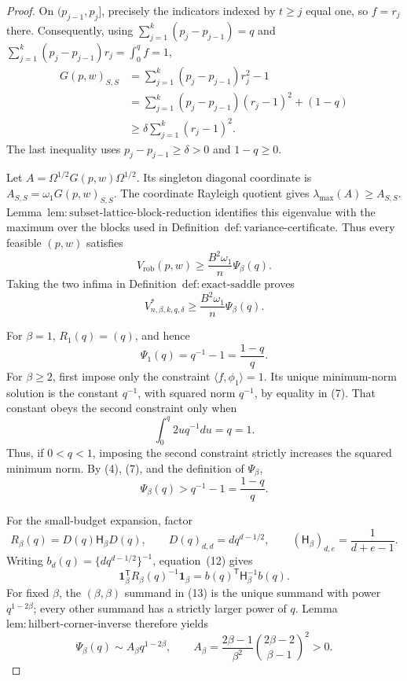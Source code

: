 \documentclass{article}
\begin{document}
\begin{proof}
On \((p_{j-1},p_j]\), precisely the indicators indexed by \(t\ge j\) equal one, so \(f=r_j\) there.  Consequently, using \(\sum_{j=1}^k(p_j-p_{j-1})=q\) and \(\sum_{j=1}^k(p_j-p_{j-1})r_j=\int_0^qf=1\),
\[
\begin{aligned}
G(p,w)_{S,S}
&=\sum_{j=1}^k(p_j-p_{j-1})r_j^2-1\\
&=\sum_{j=1}^k(p_j-p_{j-1})(r_j-1)^2+(1-q)\\
&\ge \delta\sum_{j=1}^k(r_j-1)^2.
\end{aligned}
\tag{8}
\]
The last inequality uses \(p_j-p_{j-1}\ge\delta>0\) and \(1-q\ge0\).

Let \(A=\Omega^{1/2}G(p,w)\Omega^{1/2}\).  Its singleton diagonal coordinate is \(A_{S,S}=\omega_1G(p,w)_{S,S}\).  The coordinate Rayleigh quotient gives \(\lambda_{\max}(A)\ge A_{S,S}\).  Lemma~\(\mathrm{lem{:}subset\text{-}lattice\text{-}block\text{-}reduction}\) identifies this eigenvalue with the maximum over the blocks used in Definition~\(\mathrm{def{:}variance\text{-}certificate}\).  Thus every feasible \((p,w)\) satisfies
\[
V_{\mathrm{rob}}(p,w)
\ge \frac{B^2\omega_1}{n}\Psi_\beta(q).
\]
Taking the two infima in Definition~\(\mathrm{def{:}exact\text{-}saddle}\) proves
\[
V^*_{n,\beta,k,q,\delta}
\ge \frac{B^2\omega_1}{n}\Psi_\beta(q).
\tag{9}
\]

For \(\beta=1\), \(R_1(q)=(q)\), and hence
\[
\Psi_1(q)=q^{-1}-1=\frac{1-q}{q}.
\tag{10}
\]
For \(\beta\ge2\), first impose only the constraint \(\langle f,\phi_1\rangle=1\).  Its unique minimum-norm solution is the constant \(q^{-1}\), with squared norm \(q^{-1}\), by equality in (7).  That constant obeys the second constraint only when
\[
\int_0^q2u q^{-1}du=q=1.
\]
Thus, if \(0<q<1\), imposing the second constraint strictly increases the squared minimum norm.  By (4), (7), and the definition of \(\Psi_\beta\),
\[
\Psi_\beta(q)>q^{-1}-1=\frac{1-q}{q}.
\tag{11}
\]

For the small-budget expansion, factor
\[
R_\beta(q)=D(q)\mathsf H_\beta D(q),
\qquad D(q)_{d,d}=d q^{d-1/2},
\qquad (\mathsf H_\beta)_{d,e}=\frac{1}{d+e-1}.
\tag{12}
\]
Writing \(b_d(q)=\{d q^{d-1/2}\}^{-1}\), equation~(12) gives
\[
\mathbf 1_\beta^{\mathsf T}R_\beta(q)^{-1}\mathbf 1_\beta
=b(q)^{\mathsf T}\mathsf H_\beta^{-1}b(q).
\tag{13}
\]
For fixed \(\beta\), the \((\beta,\beta)\) summand in (13) is the unique summand with power \(q^{1-2\beta}\); every other summand has a strictly larger power of \(q\).  Lemma~\(\mathrm{lem{:}hilbert\text{-}corner\text{-}inverse}\) therefore yields
\[
\Psi_\beta(q)
\sim A_\beta q^{1-2\beta},
\qquad
A_\beta=\frac{2\beta-1}{\beta^2}
\binom{2\beta-2}{\beta-1}^{\!2}>0.
\tag{14}
\]


\end{proof}
\end{document}
